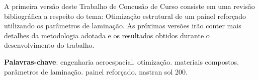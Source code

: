 \setlength{\absparsep}{18pt} %
\begin{resumo}

 A primeira versão deste Trabalho de Concusão de Curso consiste em uma revisão bibliográfica a respeito do tema: Otimização estrutural de um painel reforçado utilizando os parâmetros de laminação. As próximas versões irão conter mais detalhes da metodologia adotada e os resultados obtidos durante o desenvolvimento do trabalho.


 \textbf{Palavras-chave}: engenharia aeroespacial. otimização. materiais compostos. parâmetros de laminação. painel reforçado. nastran sol 200.
\end{resumo}

%
%
%
%
%
%
